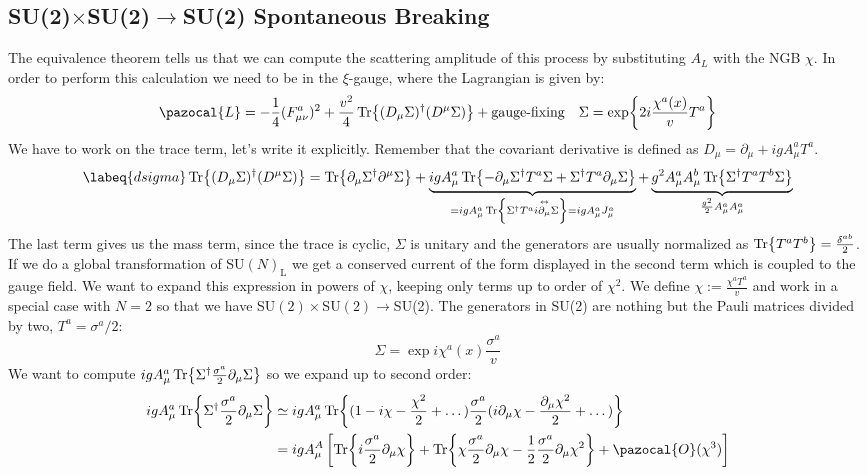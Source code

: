 \documentclass[../main.tex]{subfiles}
\begin{document}
\subsection{SU(2)$\times$SU(2)$\to$SU(2) Spontaneous Breaking}
The equivalence theorem tells us that we can compute the scattering amplitude of this process by substituting $A_L$ with the NGB $\chi$. In order to perform this calculation we need to be in the $\xi$-gauge, where the Lagrangian is given by:
\[
\pazocal{L}=-\frac{1}{4}(F_{\mu\nu}^a)^2+\frac{v^2}{4}\Tr{(D_\mu\Sigma)^\dagger(D^\mu\Sigma)}+\text{gauge-fixing} \quad \Sigma=\exp{2i\frac{\chi^a(x)}{v}T^a}
\]
We have to work on the trace term, let's write it explicitly. Remember that the covariant derivative is defined as $D_\mu=\partial_\mu+igA_\mu^aT^a$.
\begin{equation}
\labeq{dsigma}
\Tr{(D_\mu\Sigma)^\dagger(D^\mu\Sigma)}=\Tr{\partial_\mu\Sigma^\dagger\partial^\mu\Sigma}+\underbrace{igA_\mu^a\Tr{-\partial_\mu\Sigma^\dagger T^a\Sigma+\Sigma^\dagger T^a\partial_\mu\Sigma}}_{=igA_\mu^a\Tr{\Sigma^\dagger T^ai\overset{\leftrightarrow}{\partial_\mu}\Sigma}=igA_\mu^aJ_\mu^a}+\underbrace{g^2A_\mu^aA_\mu^b\Tr{\Sigma^\dagger T^aT^b\Sigma}}_{\frac{g^2}{2}A_\mu^aA_\mu^a}
\end{equation}
The last term gives us the mass term, since the trace is cyclic, $\Sigma$ is unitary and the generators are usually normalized as $\Tr{T^aT^b}=\frac{\delta^{ab}}{2}$. If we do a global transformation of SU$(N)_{\text{L}}$ we get a conserved current of the form displayed in the second term which is coupled to the gauge field. We want to expand this expression in powers of $\chi$, keeping only terms up to order of $\chi^2$. We define $\chi:=\frac{\chi^aT^a}{v}$ and work in a special case with $N=2$ so that we have SU$(2)\times$SU$(2)\to$SU(2). The generators in SU(2) are nothing but the Pauli matrices divided by two, $T^a=\sigma^a/2$:
\[
\Sigma=\exp{i\chi^a(x)\frac{\sigma^a}{v}}
\]
We want to compute $igA_\mu^a\Tr{\Sigma^\dagger\frac{\sigma^a}{2}\partial_\mu\Sigma}$ so we expand up to second order:
\begin{align*}
igA_\mu^a\Tr{\Sigma^\dagger\frac{\sigma^a}{2}\partial_\mu\Sigma}&\simeq igA_\mu^a\Tr{(1-i\chi-\frac{\chi^2}{2}+\dots)\frac{\sigma^a}{2}(i\partial_\mu\chi-\frac{\partial_\mu\chi^2}{2}+\dots)}\\
&=igA_\mu^A\left[\Tr{i\frac{\sigma^a}{2}\partial_\mu\chi}+\Tr{\chi\frac{\sigma^a}{2}\partial_\mu\chi-\frac{1}{2}\frac{\sigma^a}{2}\partial_\mu\chi^2}+\pazocal{O}(\chi^3)\right]
\end{align*}
\end{document}
